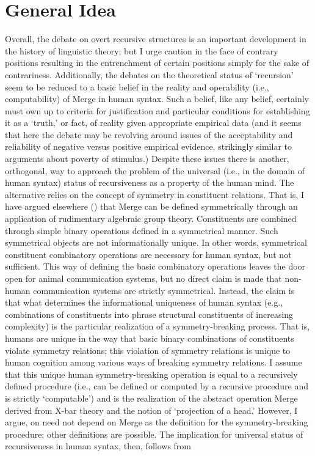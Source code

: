 \documentclass[11pt]{article}
\begin{document}
\section{General Idea}
Overall, the debate on overt recursive structures is an important development in the history of linguistic theory; but I urge caution in the face of contrary positions resulting in the entrenchment of certain positions simply for the sake of contrariness. Additionally, the debates on the theoretical status of `recursion' seem to be reduced to a basic belief in the reality and operability (i.e., computability) of Merge in human syntax. Such a belief, like any belief, certainly must own up to criteria for justification and particular conditions for establishing it as a `truth,' or fact, of reality given appropriate empirical data (and it seems that here the debate may be revolving around issues of the acceptability and reliability of negative versus positive empirical evidence, strikingly similar to arguments about poverty of stimulus.) Despite these issues there is another, orthogonal, way to approach the problem of the universal (i.e., in the domain of human syntax) status of recursiveness as a property of the human mind. The alternative relies on the concept of symmetry in constituent relations. That is, I have argued elsewhere (\citealt{bowles09amerge}) that Merge can be defined symmetrically through an application of rudimentary algebraic group theory. Constituents are combined through simple binary operations defined in a symmetrical manner. Such symmetrical objects are not informationally unique. In other words, symmetrical constituent combinatory operations are necessary for human syntax, but not sufficient. This way of defining the basic combinatory operations leaves the door open for animal communication systems, but no direct claim is made that non-human communication systems are strictly symmetrical. Instead, the claim is that what determines the informational uniqueness of human syntax (e.g., combinations of constituents into phrase structural constituents of increasing complexity) is the particular realization of a symmetry-breaking process. That is, humans are unique in the way that basic binary combinations of constituents violate symmetry relations; this violation of symmetry relations is unique to human cognition among various ways of breaking symmetry relations. I assume that this unique human symmetry-breaking operation is equal to a recursively defined procedure (i.e., can be defined or computed by a recursive procedure and is strictly `computable') and is the realization of the abstract operation Merge derived from X-bar theory and the notion of `projection of a head.' However, I argue, on need not depend on Merge as the definition for the symmetry-breaking procedure; other definitions are possible. The implication for universal status of recursiveness in human syntax, then, follows from
\end{document}

